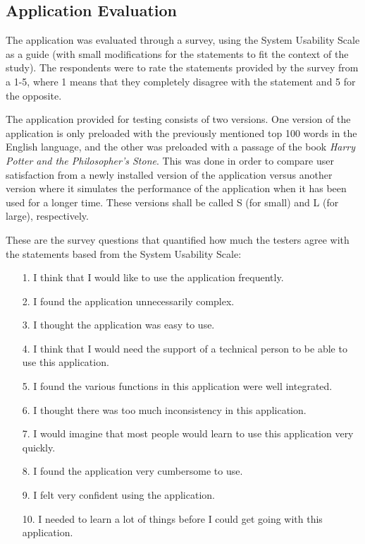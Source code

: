 \documentclass[journal]{./IEEE/IEEEtran}
\begin{document}
\subsection{Application Evaluation}
The application was evaluated through a survey, using the System Usability Scale as a guide (with small modifications for the statements to fit the context of the study). The respondents were to rate the statements provided by the survey from a 1-5, where 1 means that they completely disagree with the statement and 5 for the opposite.

The application provided for testing consists of two versions. One version of the application is only preloaded with the previously mentioned top 100 words in the English language, and the other was preloaded with a passage of the book \textit{Harry Potter and the Philosopher's Stone}. This was done in order to compare user satisfaction from a newly installed version of the application versus another version where it simulates the performance of the application when it has been used for a longer time. These versions shall be called S (for small) and L (for large), respectively.

These are the survey questions that quantified how much the testers agree with the statements based from the System Usability Scale\cite{UsabilityGeeks}:

\begin{enumerate}{}

\item[1.] I think that I would like to use the application frequently.

\item[2.] I found the application unnecessarily complex.

\item[3.] I thought the application was easy to use.

\item[4.] I think that I would need the support of a technical person to be able to use this application.

\item[5.] I found the various functions in this application were well integrated.

\item[6.] I thought there was too much inconsistency in this application.

\item[7.] I would imagine that most people would learn to use this application very quickly.

\item[8.] I found the application very cumbersome to use.

\item[9.] I felt very confident using the application.

\item[10.] I needed to learn a lot of things before I could get going with this application.

\end{enumerate}
\end{document}
